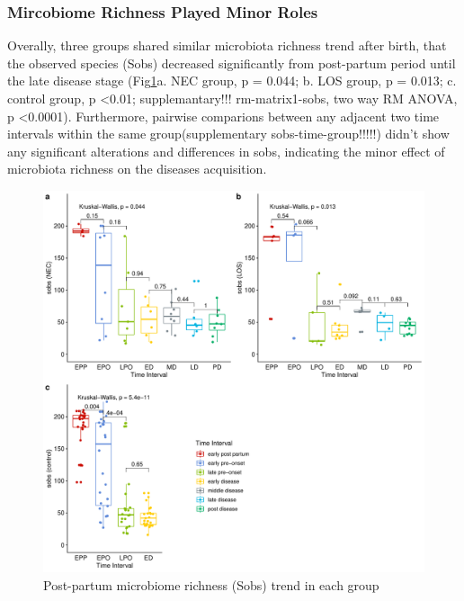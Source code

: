 \documentclass[fleqn,10pt, lineno]{wlpeerj} %
\begin{document}
    \subsubsection*{Mircobiome Richness Played Minor Roles}
    Overally, three groups shared similar microbiota richness trend after birth, that the observed species (Sobs) decreased significantly from post-partum period until the late disease stage (Fig\ref{fig:sobs-group-time}a. NEC group, p = 0.044; b. LOS group, p = 0.013; c. control group, p \textless 0.01; supplemantary!!! rm-matrix1-sobs, two way RM ANOVA, p \textless 0.0001). Furthermore, pairwise comparions between any adjacent two time intervals within the same group(supplementary sobs-time-group!!!!!) didn't show any significant alterations and differences in sobs, indicating the minor effect of microbiota richness on the diseases acquisition.
      \begin{figure}[ht]\centering
        \includegraphics[width=\linewidth]{figure/sobs-group-time.pdf}
        \caption{Post-partum microbiome richness (Sobs) trend in each group}
        \label{fig:sobs-group-time}
      \end{figure}
\end{document}
